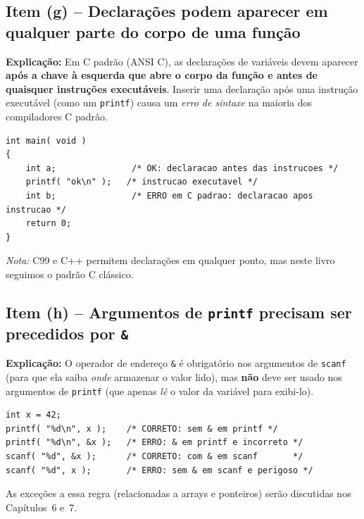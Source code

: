 \documentclass[12pt,a4paper]{article}
\begin{document}
\subsection*{Item (g) -- Declarações podem aparecer em qualquer parte do corpo de uma função}

\begin{tcolorbox}[colback=red!5,colframe=deitelred,title={\bfseries FALSO}]
\textbf{Explicação:} Em C padrão (ANSI C), as declarações de variáveis devem aparecer
\textbf{após a chave à esquerda que abre o corpo da função e antes de quaisquer instruções
executáveis}. Inserir uma declaração após uma instrução executável (como um \texttt{printf})
causa um \textit{erro de sintaxe} na maioria dos compiladores C padrão.

\begin{lstlisting}
int main( void )
{
    int a;               /* OK: declaracao antes das instrucoes */
    printf( "ok\n" );   /* instrucao executavel */
    int b;               /* ERRO em C padrao: declaracao apos instrucao */
    return 0;
}
\end{lstlisting}

\textit{Nota:} C99 e C++ permitem declarações em qualquer ponto, mas neste livro
seguimos o padrão C clássico.
\end{tcolorbox}

\subsection*{Item (h) -- Argumentos de \texttt{printf} precisam ser precedidos por \texttt{\&}}

\begin{tcolorbox}[colback=red!5,colframe=deitelred,title={\bfseries FALSO}]
\textbf{Explicação:} O operador de endereço \texttt{\&} é obrigatório nos argumentos de
\texttt{scanf} (para que ela saiba \textit{onde} armazenar o valor lido), mas
\textbf{não} deve ser usado nos argumentos de \texttt{printf} (que apenas \textit{lê}
o valor da variável para exibi-lo).

\begin{lstlisting}
int x = 42;
printf( "%d\n", x );    /* CORRETO: sem & em printf */
printf( "%d\n", &x );   /* ERRO: & em printf e incorreto */
scanf( "%d", &x );      /* CORRETO: com & em scanf       */
scanf( "%d", x );       /* ERRO: sem & em scanf e perigoso */
\end{lstlisting}

As exceções a essa regra (relacionadas a arrays e ponteiros) serão discutidas nos
Capítulos~6 e~7.
\end{tcolorbox}
\end{document}
